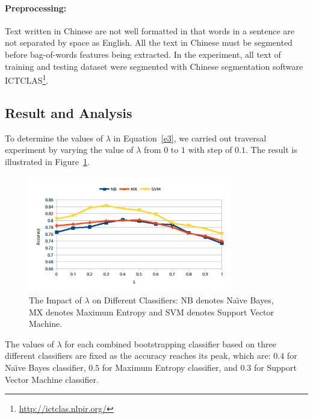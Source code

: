 \documentclass{llncs}
\begin{document}
\paragraph{Preprocessing:}
Text written in Chinese are not well formatted in that words in a sentence are not separated by space as English. 
All the text in Chinese must be segmented before bag-of-words features being extracted. 
In the experiment, all text of training and testing dataset were segmented with Chinese segmentation software ICTCLAS\footnote{\url{http://ictclas.nlpir.org/}}.

\subsection{Result and Analysis}
\label{result}
To determine the values of $ \lambda $ in Equation~\ref{e3}, we carried out traversal experiment by varying the value of $ \lambda $ from $ 0 $ to $ 1 $ with step of $ 0.1 $. The result is illustrated in Figure~\ref{fig2}.
\begin{figure}
\centering
\includegraphics[width=3.5in,height=2.0in]{lambda.pdf}
\caption{The Impact of $ \lambda $ on Different Classifiers: NB denotes Na\"\i ve Bayes, MX denotes Maximum Entropy and SVM denotes Support Vector Machine.}
\label{fig2}
\end{figure}
The values of $ \lambda $ for each combined bootstrapping classifier based on three different classifiers are fixed as the accuracy reaches its peak, which are: $ 0.4 $ for Na\"\i ve Bayes classifier, $ 0.5 $ for Maximum Entropy classifier, and $ 0.3 $ for Support Vector Machine classifier.
\end{document}

